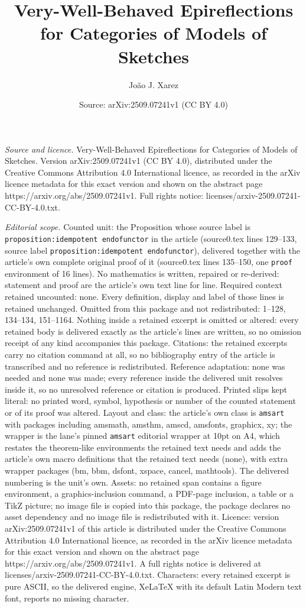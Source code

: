 \documentclass[10pt,a4paper]{amsart}
\title[Very-Well-Behaved Epireflections for Categories of Models of]{Very-Well-Behaved Epireflections for Categories of Models of Sketches}
\author{Jo\~ao J. Xarez}
\date{Source: arXiv:2509.07241v1 (CC BY 4.0)}
\begin{document}
\maketitle

\noindent\emph{Source and licence.} Very-Well-Behaved Epireflections for Categories of Models of Sketches. Version arXiv:2509.07241v1 (CC BY 4.0), distributed under the Creative Commons Attribution 4.0 International licence, as recorded in the arXiv licence metadata for this exact version and shown on the abstract page https://arxiv.org/abs/2509.07241v1. Full rights notice: licenses/arxiv-2509.07241-CC-BY-4.0.txt.\par\smallskip

\noindent\textit{Editorial scope.} Counted unit: the Proposition whose source label is \texttt{proposition:idempotent endofunctor} in the article (source0.tex lines 129--133, source label \texttt{proposition:idempotent endofunctor}), delivered together with the article's own complete original proof of it (source0.tex lines 135--150, one \texttt{proof} environment of 16 lines). No mathematics is written, repaired or re-derived: statement and proof are the article's own text line for line. Required context retained uncounted: none. Every definition, display and label of those lines is retained unchanged. Omitted from this package and not redistributed: 1--128, 134--134, 151--1164. Nothing inside a retained excerpt is omitted or altered: every retained body is delivered exactly as the article's lines are written, so no omission receipt of any kind accompanies this package. Citations: the retained excerpts carry no citation command at all, so no bibliography entry of the article is transcribed and no reference is redistributed. Reference adaptation: none was needed and none was made; every reference inside the delivered unit resolves inside it, so no unresolved reference or citation is produced. Printed slips kept literal: no printed word, symbol, hypothesis or number of the counted statement or of its proof was altered. Layout and class: the article's own class is \texttt{amsart} with packages including amsmath, amsthm, amscd, amsfonts, graphicx, xy; the wrapper is the lane's pinned \texttt{amsart} editorial wrapper at 10pt on A4, which restates the theorem-like environments the retained text needs and adds the article's own macro definitions that the retained text needs (none), with extra wrapper packages (bm, bbm, dsfont, xspace, cancel, mathtools). The delivered numbering is the unit's own. Assets: no retained span contains a figure environment, a graphics-inclusion command, a PDF-page inclusion, a table or a TikZ picture; no image file is copied into this package, the package declares no asset dependency and no image file is redistributed with it. Licence: version arXiv:2509.07241v1 of this article is distributed under the Creative Commons Attribution 4.0 International licence, as recorded in the arXiv licence metadata for this exact version and shown on the abstract page https://arxiv.org/abs/2509.07241v1. A full rights notice is delivered at licenses/arxiv-2509.07241-CC-BY-4.0.txt. Characters: every retained excerpt is pure ASCII, so the delivered engine, XeLaTeX with its default Latin Modern text font, reports no missing character.
\end{document}
